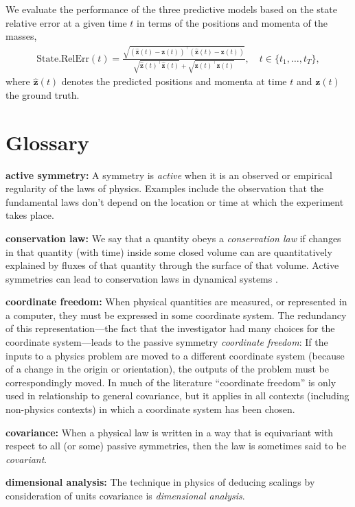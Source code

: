 \documentclass{article}
\theoremstyle{plain}
\theoremstyle{definition}
\theoremstyle{remark}
\begin{document}
We evaluate the performance of the three predictive models based on the state relative error at a given time $t$ in terms of the positions and momenta of the masses,
\begin{align}
    \text{State.RelErr}(t) =  \frac{\sqrt{(\hat{\mathbf{z}}(t)-\mathbf{z}(t))^\top (\hat{\mathbf{z}}(t)-\mathbf{z}(t))}}{\sqrt{\hat{\mathbf z}(t)^\top\hat{\mathbf z}(t)}+\sqrt{\mathbf z(t)^\top \mathbf z(t)}}, \quad t\in\{t_1,\ldots,t_T\},\label{eq:state_relerr}
\end{align}
where $\hat{\mathbf{z}}(t)$ denotes the predicted positions and momenta at time $t$ and $\mathbf{z}(t)$ the ground truth.

\section{Glossary}\label{app:glossary}
\textbf{active symmetry:}
A symmetry is \emph{active} when it is an observed or empirical regularity of the laws of physics.
Examples include the observation that the fundamental laws don't depend on the location or time at which the experiment takes place.

\textbf{conservation law:}
We say that a quantity obeys a \emph{conservation law} if changes in that quantity (with time) inside some closed volume can are quantitatively explained by fluxes of that quantity through the surface of that volume.
Active symmetries can lead to conservation laws in dynamical systems \cite{noether}.

\textbf{coordinate freedom:}
When physical quantities are measured, or represented in a computer, they must be expressed in some coordinate system.
The redundancy of this representation---the fact that the investigator had many choices for the coordinate system---leads to the passive symmetry \emph{coordinate freedom}:
If the inputs to a physics problem are moved to a different coordinate system (because of a change in the origin or orientation), the outputs of the problem must be correspondingly moved.
In much of the literature ``coordinate freedom'' is only used in relationship to general covariance, but it applies in all contexts (including non-physics contexts) in which a coordinate system has been chosen.

\textbf{covariance:}
When a physical law is written in a way that is equivariant with respect to all (or some) passive symmetries, then the law is sometimes said to be \emph{covariant}.

\textbf{dimensional analysis:}
The technique in physics of deducing scalings by consideration of units covariance is \emph{dimensional analysis}.
\end{document}
